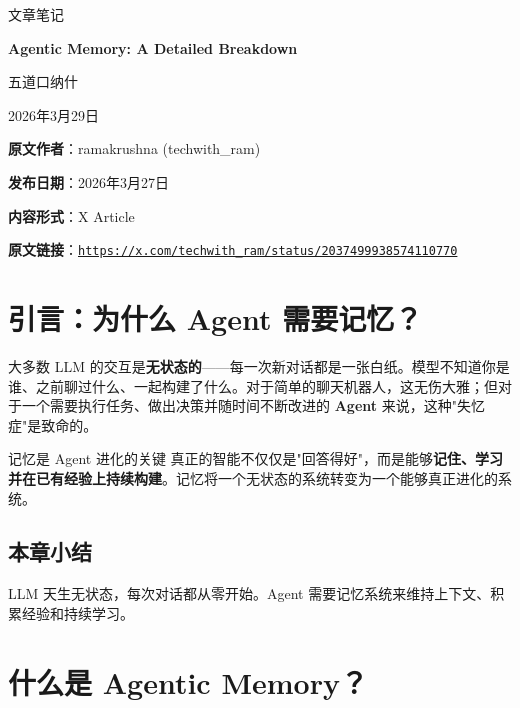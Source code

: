 \documentclass[a4paper]{article}
\newcommand{\notetitle}{Agentic Memory: A Detailed Breakdown}
\newcommand{\noteauthors}{五道口纳什}
\newcommand{\notedate}{2026年3月29日}
\newcommand{\videochannel}{ramakrushna (techwith\_ram)}
\newcommand{\videopublishdate}{2026年3月27日}
\newcommand{\videoduration}{X Article}
\newcommand{\videourl}{https://x.com/techwith_ram/status/2037499938574110770}
\begin{document}
\begin{titlepage}
\centering
{\Large 文章笔记\par}
\vspace{1.2cm}
{\huge\bfseries \notetitle\par}
\vspace{0.8cm}
{\large \noteauthors\par}
\vspace{0.3cm}
{\large \notedate\par}
\vspace{1.2cm}

\vfill
\begin{tcolorbox}[width=0.9\textwidth, colback=black!2!white, colframe=black!60, sharp corners]
\textbf{原文作者}：\videochannel\par
\textbf{发布日期}：\videopublishdate\par
\textbf{内容形式}：\videoduration\par
\textbf{原文链接}：\href{\videourl}{\nolinkurl{\videourl}}
\end{tcolorbox}
\end{titlepage}

\tableofcontents
\newpage


\section{引言：为什么 Agent 需要记忆？}

大多数 LLM 的交互是\textbf{无状态的}——每一次新对话都是一张白纸。模型不知道你是谁、之前聊过什么、一起构建了什么。对于简单的聊天机器人，这无伤大雅；但对于一个需要执行任务、做出决策并随时间不断改进的 \textbf{Agent} 来说，这种"失忆症"是致命的。

\begin{importantbox}{记忆是 Agent 进化的关键}
真正的智能不仅仅是"回答得好"，而是能够\textbf{记住、学习并在已有经验上持续构建}。记忆将一个无状态的系统转变为一个能够真正进化的系统。
\end{importantbox}

\subsection{本章小结}

LLM 天生无状态，每次对话都从零开始。Agent 需要记忆系统来维持上下文、积累经验和持续学习。

\section{什么是 Agentic Memory？}
\end{document}
